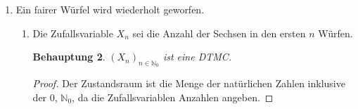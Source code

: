 \documentclass[a4paper]{scrartcl}
\newtheorem*{behaupt}{Behauptung}
\newcommand{\N}{\mathbb{N}}
\newcommand{\prob}{\mathbb{P}}
\newcommand{\e}{\mathbb{E}}
\begin{document}
\begin{enumerate}[label=\bfseries 1.\arabic*]
\begin{enumerate}[label=\alph*)]
            \item
                \begin{behaupt}
                    Der Erwartungswert einer binomialverteilten Zufallsvariable
                    $X \sim \text{Bin}_{n,p}$ ist $\e[X] = n \cdot p$.
                \end{behaupt}
                \begin{proof}
                    $X$ lässt sich als Summe von Indikatorzufallsvariablen
                    schreiben, die jeweils den Ausgang eines Elements anzeigen:
                    $X = \sum_{i=1}^n X_i$ mit $X_i \sim \text{Bin}_{1,p}$.
                    Für die $X_i$ gilt jeweils
                    \begin{equation*}
                        \e[X_i] = 0 \cdot \prob(X_i=0) + 1 \cdot \prob(X_i=1)
                        = p \text{ .}
                    \end{equation*}
                    Aus der Linearität des Erwartungswertes folgt:
                    \begin{equation*}
                        \begin{split}
                            \e[X]
                            &= \e\left[\sum_{i=0}^n X_i\right] \\
                            &= \sum_{i=0}^n \e[X_i] \\
                            &= \sum_{i=0}^n p \\
                            &= n \cdot p
                        \end{split}
                    \end{equation*}
                \end{proof}

        \end{enumerate}

    \item
        Ein fairer Würfel wird wiederholt geworfen.
        \begin{enumerate}[label=\alph*)]
            \item
                Die Zufallsvariable $X_n$ sei die Anzahl der Sechsen in den
                ersten $n$ Würfen.

                \begin{behaupt}
                    $(X_n)_{n \in \N_0}$ ist eine DTMC.
                \end{behaupt}
                \begin{proof}
                    Der Zustandsraum ist die Menge der natürlichen Zahlen
                    inklusive der $0$, $\N_0$, da die Zufallsvariablen Anzahlen
                    angeben.


\end{proof}
\end{enumerate}
\end{enumerate}
\end{document}
